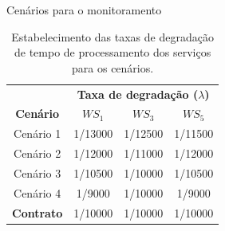 \documentclass[xcolor=svgnames]{beamer}
\newcommand {\otoprule}{\midrule [\heavyrulewidth]}  %
\begin{document}
  \begin{frame}{Cenários para o monitoramento}
    \begin{center}
      \begin{table}[h]
	  \centering
	\caption{ Estabelecimento das taxas de degradação de tempo de processamento dos serviços para os cenários.  }
	\begin{center}
	  \begin{tabular}{ cccc}
	    \toprule[1pt]
			&   \multicolumn{3}{c}{ \textbf{Taxa de degradação ($\lambda$)} } \\
	    \textbf{Cenário}    &    $WS_1$	  &	  $WS_3$ 	& 	 $WS_5$ \\
	    \midrule[1pt]
	    Cenário 1 &		\cellcolor{red!25} 1/13000  	 & 	\cellcolor{red!25} 1/12500		&	\cellcolor{red!25} 1/11500	\\
	    Cenário 2 &		\cellcolor{red!25} 1/12000  	 & 	\cellcolor{red!25} 1/11000		&	\cellcolor{red!25} 1/12000	\\
	    \midrule
	    Cenário 3 &		\cellcolor{green!25} 1/10500  	 & 	\cellcolor{green!25} 1/10000		&	\cellcolor{green!25} 1/10500	\\
	    Cenário 4 &		\cellcolor{green!25} 1/9000  	 & 	\cellcolor{green!25} 1/10000		&	\cellcolor{green!25} 1/9000	\\
	    \midrule[1pt]
	    \textbf{Contrato}  &	\cellcolor{yellow!49} 1/10000		&	\cellcolor{yellow!49} 1/10000		&	\cellcolor{yellow!49} 1/10000 \\
	    \bottomrule[1pt]
      
	  \end{tabular}
	  \label{table:scenarios_rates}
	  \end{center}
      \end{table}
    \end{center}
  \end{frame}
\end{document}
